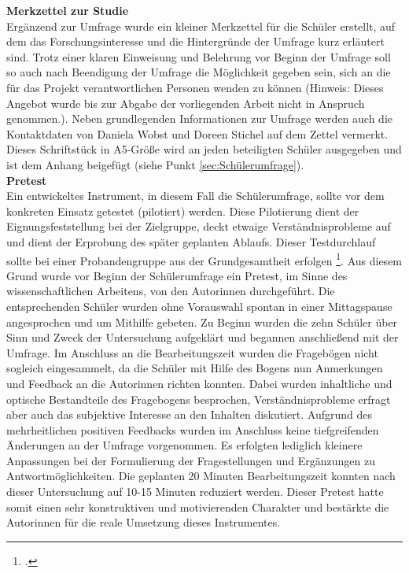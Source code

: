 \noindent
\textbf{Merkzettel zur Studie}\\

\noindent
Ergänzend zur Umfrage wurde ein kleiner Merkzettel für die Schüler erstellt, auf dem das Forschungsinteresse und die Hintergründe der Umfrage kurz erläutert sind. Trotz einer klaren Einweisung und Belehrung vor Beginn der Umfrage soll so auch nach Beendigung der Umfrage die Möglichkeit gegeben sein, sich an die für das Projekt verantwortlichen Personen wenden zu können (Hinweis: Dieses Angebot wurde bis zur Abgabe der vorliegenden Arbeit nicht in Anspruch genommen.). Neben grundlegenden Informationen zur Umfrage werden auch die Kontaktdaten von Daniela Wobst und Doreen Stichel auf dem Zettel vermerkt. Dieses Schriftstück in A5-Größe wird an jeden beteiligten Schüler ausgegeben und ist dem Anhang beigefügt (siehe Punkt \ref{sec:Schülerumfrage}).\\

\newpage
\noindent
\textbf{Pretest}\\

\noindent
Ein entwickeltes Instrument, in diesem Fall die Schülerumfrage, sollte vor dem konkreten Einsatz getestet (pilotiert) werden. Diese Pilotierung dient der Eignungsfeststellung bei der Zielgruppe, deckt etwaige Verständnisprobleme auf und dient der Erprobung des später geplanten Ablaufs. Dieser Testdurchlauf sollte bei einer Probandengruppe aus der Grundgesamtheit erfolgen \footcite[vgl.][275]{Krueger2014}. Aus diesem Grund wurde vor Beginn der Schülerumfrage ein Pretest, im Sinne des wissenschaftlichen Arbeitens, von den Autorinnen durchgeführt. Die entsprechenden Schüler wurden ohne Vorauswahl spontan in einer Mittagspause angesprochen und um Mithilfe gebeten. Zu Beginn wurden die zehn Schüler über Sinn und Zweck der Untersuchung aufgeklärt und begannen anschließend mit der Umfrage. Im Anschluss an die Bearbeitungszeit wurden die Fragebögen nicht sogleich eingesammelt, da die Schüler mit Hilfe des Bogens nun Anmerkungen und Feedback an die Autorinnen richten konnten. Dabei wurden inhaltliche und optische Bestandteile des Fragebogens besprochen, Verständnisprobleme erfragt aber auch das subjektive Interesse an den Inhalten diskutiert. Aufgrund des mehrheitlichen positiven Feedbacks wurden im Anschluss keine tiefgreifenden Änderungen an der Umfrage vorgenommen. Es erfolgten lediglich kleinere Anpassungen bei der Formulierung der Fragestellungen und Ergänzungen zu Antwortmöglichkeiten. Die geplanten 20 Minuten Bearbeitungszeit konnten nach dieser Untersuchung auf 10-15 Minuten reduziert werden. Dieser Pretest hatte somit einen sehr konstruktiven und motivierenden Charakter und bestärkte die Autorinnen für die reale Umsetzung dieses Instrumentes.

